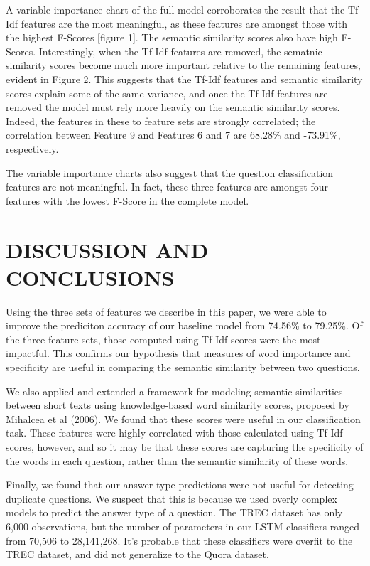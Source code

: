 \documentclass[letterpaper, 10 pt, conference]{ieeeconf}  %
\begin{document}
A variable importance chart of the full model corroborates the result that the Tf-Idf features are the most meaningful, as these features are amongst those with the highest F-Scores [figure 1]. The semantic similarity scores also have high F-Scores. Interestingly, when the Tf-Idf features are removed, the sematnic similarity scores become much more important relative to the remaining features, evident in Figure 2. This suggests that the Tf-Idf features and semantic similarity scores explain some of the same variance, and once the Tf-Idf features are removed the model must rely more heavily on the semantic similarity scores. Indeed, the features in these to feature sets are strongly correlated; the correlation between Feature 9 and Features 6 and 7 are 68.28\% and -73.91\%, respectively. 

The variable importance charts also suggest that the question classification features are not meaningful. In fact, these three features are amongst four features with the lowest F-Score in the complete model. 


\section{DISCUSSION AND CONCLUSIONS}

Using the three sets of features we describe in this paper, we were able to improve the prediciton accuracy of our baseline model from 74.56\% to 79.25\%. Of the three feature sets, those computed using Tf-Idf scores were the most impactful. This confirms our hypothesis that measures of word importance and specificity are useful in comparing the semantic similarity between two questions. 

We also applied and extended a framework for modeling semantic similarities between short texts using knowledge-based word similarity scores, proposed by Mihalcea et al (2006). We found that these scores were useful in our classification task. These features were highly correlated with those calculated using Tf-Idf scores, however, and so it may be that these scores are capturing the specificity of the words in each question, rather than the semantic similarity of these words. 

Finally, we found that our answer type predictions were not useful for detecting duplicate questions. We suspect that this is because we used overly complex models to predict the answer type of a question. The TREC dataset has only 6,000 observations, but the number of parameters in our LSTM classifiers ranged from 70,506 to 28,141,268. It's probable that these classifiers were overfit to the TREC dataset, and did not generalize to the Quora dataset. 
\end{document}
